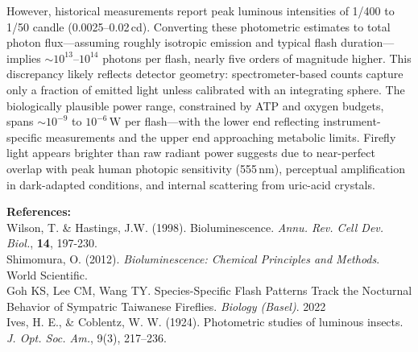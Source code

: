 \begin{technical}
However, historical measurements report peak luminous intensities of 1/400 to 1/50 candle (0.0025–0.02\,cd). Converting these photometric estimates to total photon flux—assuming roughly isotropic emission and typical flash duration—implies $\sim 10^{13}$–$10^{14}$ photons per flash, nearly five orders of magnitude higher. This discrepancy likely reflects detector geometry: spectrometer-based counts capture only a fraction of emitted light unless calibrated with an integrating sphere. The biologically plausible power range, constrained by ATP and oxygen budgets, spans $\sim 10^{-9}$ to $10^{-6}\,\text{W}$ per flash—with the lower end reflecting instrument-specific measurements and the upper end approaching metabolic limits. Firefly light appears brighter than raw radiant power suggests due to near-perfect overlap with peak human photopic sensitivity (555\,nm), perceptual amplification in dark-adapted conditions, and internal scattering from uric-acid crystals. 

\vspace{0.5em}
\noindent\textbf{References:}\\
{\footnotesize
Wilson, T. \& Hastings, J.W. (1998). Bioluminescence. \textit{Annu. Rev. Cell Dev. Biol.}, \textbf{14}, 197-230.\\
Shimomura, O. (2012). \textit{Bioluminescence: Chemical Principles and Methods}. World Scientific.\\
Goh KS, Lee CM, Wang TY. Species-Specific Flash Patterns Track the Nocturnal Behavior of Sympatric Taiwanese Fireflies. \textit{Biology (Basel)}. 2022\\
Ives, H. E., \& Coblentz, W. W. (1924). Photometric studies of luminous insects. \textit{J. Opt. Soc. Am.}, 9(3), 217–236.
}
\end{technical}